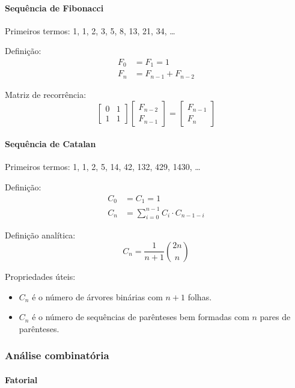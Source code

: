\paragraph{Sequência de Fibonacci}

Primeiros termos: 1, 1, 2, 3, 5, 8, 13, 21, 34, \dots

Definição:
\begin{align*}
F_0 &= F_1 = 1 \\
F_n &= F_{n-1} + F_{n-2}
\end{align*}

Matriz de recorrência:
\[
\begin{bmatrix}
0 & 1 \\
1 & 1
\end{bmatrix}
\begin{bmatrix}
F_{n-2} \\
F_{n-1}
\end{bmatrix}
=
\begin{bmatrix}
F_{n-1} \\
F_n
\end{bmatrix}
\]

\paragraph{Sequência de Catalan}

Primeiros termos: 1, 1, 2, 5, 14, 42, 132, 429, 1430, \dots

Definição:
\begin{align*}
C_0 &= C_1 = 1 \\
C_n &= \sum_{i=0}^{n-1} C_i \cdot C_{n-1-i}
\end{align*}

Definição analítica:
\[
C_n = \frac{1}{n+1} \binom{2n}{n}
\]

Propriedades úteis:
\begin{itemize}\setlength\itemsep{0pt}
    \item $C_n$ é o número de árvores binárias com $n + 1$ folhas.
    \item $C_n$ é o número de sequências de parênteses bem formadas com $n$ pares de parênteses.
\end{itemize}

\subsubsection{Análise combinatória}

\paragraph{Fatorial}

